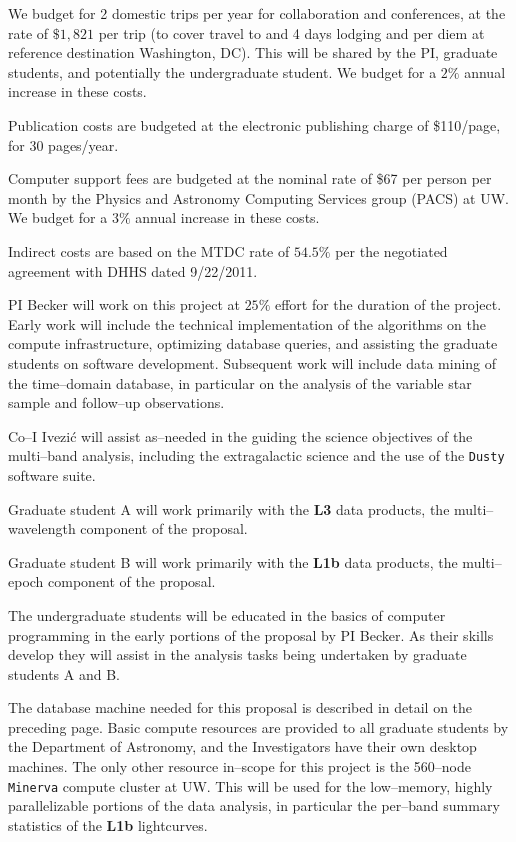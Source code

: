 \bigskip {} 

We budget for 2 domestic trips per year for collaboration and
conferences, at the rate of $\$1,821$ per trip (to cover travel to and
4 days lodging and per diem at reference destination Washington, DC).
This will be shared by the PI, graduate students, and potentially the
undergraduate student. We budget for a $2\%$ annual increase in these
costs.

\pagebreak

\bigskip {} 

Publication costs are budgeted at the electronic publishing charge
of \$110/page, for 30 pages/year.

\bigskip {} 

Computer support fees are budgeted at the nominal rate of \$67 per
person per month by the Physics and Astronomy Computing Services group
(PACS) at UW.  We budget for a $3\%$ annual increase in these costs.

\bigskip {} 

Indirect costs are based on the MTDC rate of $54.5\%$ per the
negotiated agreement with DHHS dated 9/22/2011.

\bigskip {}

PI Becker will work on this project at $25\%$ effort for the duration
of the project.  Early work will include the technical implementation
of the algorithms on the compute infrastructure, optimizing database
queries, and assisting the graduate students on software development.
Subsequent work will include data mining of the time--domain database,
in particular on the analysis of the variable star sample and
follow--up observations.

Co--I Ivezi\'{c} will assist as--needed in the guiding the science
objectives of the multi--band analysis, including the extragalactic
science and the use of the {\tt Dusty} software suite.

Graduate student A will work primarily with the {\bf L3} data
products, the multi--wavelength component of the proposal.

Graduate student B will work primarily with the {\bf L1b} data
products, the multi--epoch component of the proposal.

The undergraduate students will be educated in the basics of computer
programming in the early portions of the proposal by PI Becker.  As
their skills develop they will assist in the analysis tasks being
undertaken by graduate students A and B.

\bigskip {}

The database machine needed for this proposal is described in detail
on the preceding page.  Basic compute resources are provided to all
graduate students by the Department of Astronomy, and the
Investigators have their own desktop machines.  The only other
resource in--scope for this project is the 560--node {\tt Minerva}
compute cluster at UW.  This will be used for the low--memory, highly
parallelizable portions of the data analysis, in particular the
per--band summary statistics of the {\bf L1b} lightcurves.

